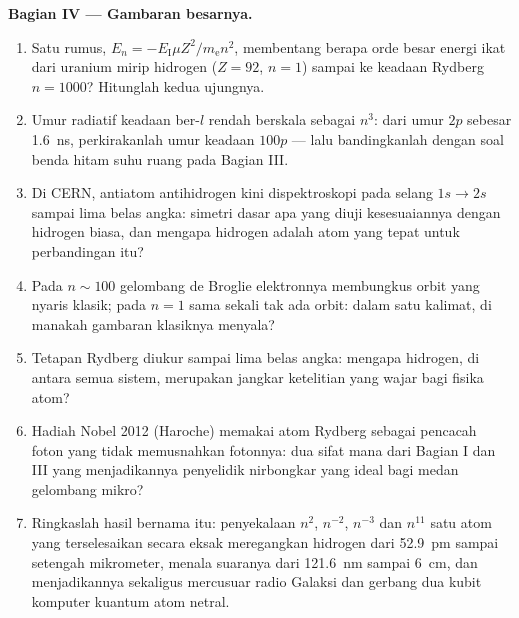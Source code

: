 \begin{problem}
\medskip\noindent\textbf{Bagian IV --- Gambaran besarnya.}
\begin{enumerate}[resume]
  \item Satu rumus, $E_n = -E_{\text{I}}\mu Z^2/m_{\text{e}}n^2$,
        membentang berapa orde besar energi ikat dari uranium mirip
        hidrogen ($Z = 92$, $n = 1$) sampai ke keadaan Rydberg
        $n = 1000$? Hitunglah kedua ujungnya.
  \item Umur radiatif keadaan ber-$l$ rendah berskala sebagai $n^3$:
        dari umur $2p$ sebesar \qty{1.6}{ns}, perkirakanlah umur
        keadaan $100p$ --- lalu bandingkanlah dengan soal benda hitam
        suhu ruang pada Bagian III.
  \item Di CERN, antiatom antihidrogen kini dispektroskopi pada selang
        $1s \to 2s$ sampai lima belas angka: simetri dasar apa yang
        diuji kesesuaiannya dengan hidrogen biasa, dan mengapa hidrogen
        adalah atom yang tepat untuk perbandingan itu?
  \item Pada $n \sim 100$ gelombang de Broglie elektronnya membungkus
        orbit yang nyaris klasik; pada $n = 1$ sama sekali tak ada
        orbit: dalam satu kalimat, di manakah gambaran klasiknya
        menyala?
  \item Tetapan Rydberg diukur sampai lima belas angka: mengapa
        hidrogen, di antara semua sistem, merupakan jangkar ketelitian
        yang wajar bagi fisika atom?
  \item Hadiah Nobel 2012 (Haroche) memakai atom Rydberg sebagai
        pencacah foton yang tidak memusnahkan fotonnya: dua sifat mana
        dari Bagian I dan III yang menjadikannya penyelidik nirbongkar
        yang ideal bagi medan gelombang mikro?
  \item Ringkaslah hasil bernama itu: penyekalaan $n^2$, $n^{-2}$,
        $n^{-3}$ dan $n^{11}$ satu atom yang terselesaikan secara eksak
        meregangkan hidrogen dari \qty{52.9}{pm} sampai setengah
        mikrometer, menala suaranya dari \qty{121.6}{nm} sampai
        \qty{6}{cm}, dan menjadikannya sekaligus mercusuar radio
        Galaksi dan gerbang dua kubit komputer kuantum atom netral.
\end{enumerate}
\end{problem}
